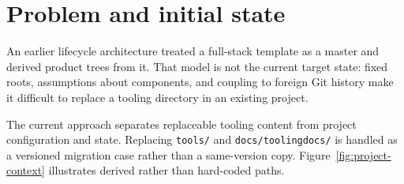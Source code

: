 \section{Problem and initial state}
\label{chap:problem-initial-state}

An earlier lifecycle architecture treated a full-stack template as a master and derived
product trees from it. That model is not the current target state: fixed roots,
assumptions about components, and coupling to foreign Git history make it difficult to
replace a tooling directory in an existing project.

The current approach separates replaceable tooling content from project configuration and
state. Replacing \texttt{tools/} and \texttt{docs/toolingdocs/} is handled as a versioned
migration case rather than a same-version copy. Figure~\ref{fig:project-context}
illustrates derived rather than hard-coded paths.
